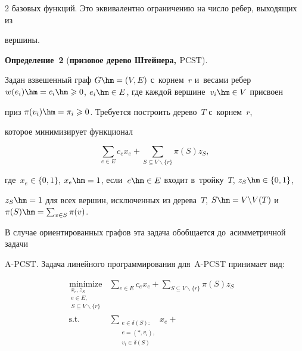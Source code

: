 \begin{multicols}{2}
базовых функций. Это эквивалентно ограничению на число ребер, выходящих из 

вершины.



\smallskip



\noindent

\textbf{Определение~2} (\textbf{призовое дерево Штейнера, $\text{PCST}$}).

Задан взвешенный граф $G\hm=(V,E)$ с~корнем~$r$ и~весами ребер~$w(e_i)\hm=c_i\hm\geqslant  0$, $e_i\hm\in E$, где каждой вершине~$v_i \hm\in V$ присвоен 

{приз} $\pi(v_i)\hm=\pi_i\geqslant 0$. Требуется построить дерево~$T$ с~корнем~$r$, 

которое минимизирует функционал

$$

\sum\limits_{e\in E}c_ex_e + \sum\limits_{S\subseteq V\backslash\{r\}} 

\pi(S)z_S,

$$

где~$x_e\in\{0, 1\}$, $x_e\hm=1$, если~$e\hm\in E$ входит в~тройку~$T$, $z_S\hm\in\{0, 1\}$, 

$z_S\hm=1$ для всех вершин, исключенных из дерева~$T$, $S \hm= V\backslash V(T)$ и~$\pi(S)\hm= \sum\nolimits_{v\in S}\pi(v)$.



\smallskip



В случае ориентированных графов эта задача обобщается до~асимметричной задачи 

A-PCST. Задача линейного программирования для~A-PCST принимает вид:

\begin{equation}

\left.

\begin{array}{rll}

\!\!\!\underset{\substack{x_e,z_S \\ e\in E,\\ S\subseteq V\backslash \{r\}}}{\mbox{minimize}} & 

\displaystyle \sum\limits_{e\in E} c_e x_e + \sum\limits_{S\subseteq V\backslash\{r\}}  \!\!\!\!\!\pi(S)z_S &\\[6pt]

\!\!\!\mbox{s.t.} & \displaystyle \sum\limits_{\substack{e\in\delta(S):\\e=(\ast,v_i),\\ v_i\in\delta(S)}} \!\!\!\!\!\! x_e + 


\end{array}
\end{equation}
\end{multicols}
